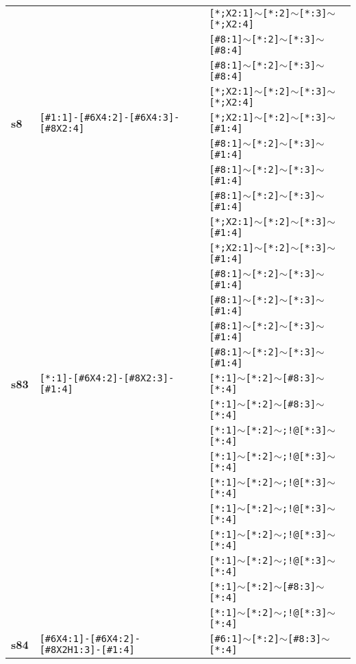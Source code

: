 \begin{longtable}{>{\baselineskip=10pt}p{} >{\baselineskip=10pt}p{} >{\baselineskip=10pt}p{}}
 &  & \texttt{[*;X2:1]$\sim$[*:2]$\sim$[*:3]$\sim$[*;X2:4]} \\ 
 &  & \texttt{[\#8:1]$\sim$[*:2]$\sim$[*:3]$\sim$[\#8:4]} \\ 
 &  & \texttt{[\#8:1]$\sim$[*:2]$\sim$[*:3]$\sim$[\#8:4]} \\ 
 &  & \texttt{[*;X2:1]$\sim$[*:2]$\sim$[*:3]$\sim$[*;X2:4]} \\ 
\hline 
\textbf{s8} & \texttt{[\#1:1]-[\#6X4:2]-[\#6X4:3]-[\#8X2:4]} & \texttt{[*;X2:1]$\sim$[*:2]$\sim$[*:3]$\sim$[\#1:4]} \\ 
 &  & \texttt{[\#8:1]$\sim$[*:2]$\sim$[*:3]$\sim$[\#1:4]} \\ 
 &  & \texttt{[\#8:1]$\sim$[*:2]$\sim$[*:3]$\sim$[\#1:4]} \\ 
 &  & \texttt{[\#8:1]$\sim$[*:2]$\sim$[*:3]$\sim$[\#1:4]} \\ 
 &  & \texttt{[*;X2:1]$\sim$[*:2]$\sim$[*:3]$\sim$[\#1:4]} \\ 
 &  & \texttt{[*;X2:1]$\sim$[*:2]$\sim$[*:3]$\sim$[\#1:4]} \\ 
 &  & \texttt{[\#8:1]$\sim$[*:2]$\sim$[*:3]$\sim$[\#1:4]} \\ 
 &  & \texttt{[\#8:1]$\sim$[*:2]$\sim$[*:3]$\sim$[\#1:4]} \\ 
 &  & \texttt{[\#8:1]$\sim$[*:2]$\sim$[*:3]$\sim$[\#1:4]} \\ 
 &  & \texttt{[\#8:1]$\sim$[*:2]$\sim$[*:3]$\sim$[\#1:4]} \\ 
\hline 
\textbf{s83} & \texttt{[*:1]-[\#6X4:2]-[\#8X2:3]-[\#1:4]} & \texttt{[*:1]$\sim$[*:2]$\sim$[\#8:3]$\sim$[*:4]} \\ 
 &  & \texttt{[*:1]$\sim$[*:2]$\sim$[\#8:3]$\sim$[*:4]} \\ 
 &  & \texttt{[*:1]$\sim$[*:2]$\sim$;!@[*:3]$\sim$[*:4]} \\ 
 &  & \texttt{[*:1]$\sim$[*:2]$\sim$;!@[*:3]$\sim$[*:4]} \\ 
 &  & \texttt{[*:1]$\sim$[*:2]$\sim$;!@[*:3]$\sim$[*:4]} \\ 
 &  & \texttt{[*:1]$\sim$[*:2]$\sim$;!@[*:3]$\sim$[*:4]} \\ 
 &  & \texttt{[*:1]$\sim$[*:2]$\sim$;!@[*:3]$\sim$[*:4]} \\ 
 &  & \texttt{[*:1]$\sim$[*:2]$\sim$;!@[*:3]$\sim$[*:4]} \\ 
 &  & \texttt{[*:1]$\sim$[*:2]$\sim$[\#8:3]$\sim$[*:4]} \\ 
 &  & \texttt{[*:1]$\sim$[*:2]$\sim$;!@[*:3]$\sim$[*:4]} \\ 
\hline 
\textbf{s84} & \texttt{[\#6X4:1]-[\#6X4:2]-[\#8X2H1:3]-[\#1:4]} & \texttt{[\#6:1]$\sim$[*:2]$\sim$[\#8:3]$\sim$[*:4]} \\ 

\end{longtable}
